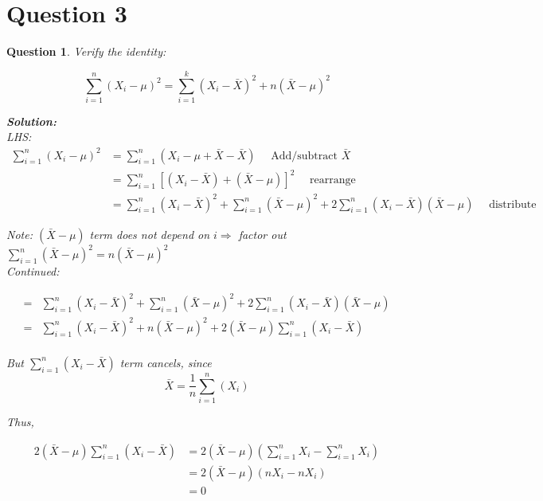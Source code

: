\documentclass{article}
\theoremstyle{questionstyle}
\newtheorem{myquestion}{Question}
\begin{document}

\section{Question 3}
\begin{myquestion}
    Verify the identity:
    
    \[ \sum_{i=1}^{n}(X_i - \mu)^2 = \sum_{i=1}^{k}(X_i - \bar{X})^2 + n(\bar{X} - \mu)^2 \]

\textbf{Solution:}\\
LHS: 
\begin{align*}
    \sum_{i=1}^{n} (X_i - \mu )^2 &= \sum_{i=1}^{n}( X_i - \mu + \bar{X} - \bar{X}) \quad \text{ Add/subtract } \bar{X}\\
    &= \sum_{i=1}^{n}\left[ (X_i- \bar{X} ) + (\bar{X}- \mu) \right]^2 \quad \text{ rearrange} \\
    &= \sum_{i=1}^{n} (X_i - \bar{X})^2 + \sum_{i=1}^{n}(\bar{X} - \mu)^2 + 2\sum_{i=1}^{n} (X_i - \bar{X})(\bar{X} - \mu) \quad \text{ distribute }
\end{align*}

Note: \((\bar{X} - \mu)\) term does not depend on \(i \Rightarrow\) factor out \( \sum_{i=1}^{n}(\bar{X} - \mu)^2 = n(\bar{X} - \mu)^2 \)\\

Continued: 

\begin{align*}
    =& \sum_{i=1}^{n} (X_i - \bar{X})^2 + \sum_{i=1}^{n}(\bar{X} - \mu)^2 + 2\sum_{i=1}^{n} (X_i - \bar{X})(\bar{X} - \mu)\\
    =& \sum_{i=1}^{n} (X_i - \bar{X})^2 + n(\bar{X} - \mu)^2 + 2(\bar{X} - \mu) \sum_{i=1}^{n} (X_i - \bar{X})\\
\end{align*}

But \( \sum_{i=1}^{n}(X_i - \bar{X}) \) term cancels, since \[\bar{X} = \frac{1}{n}\sum_{i=1}^{n}(X_i) \]

Thus, 

\begin{align*}
    2(\bar{X} - \mu)\sum_{i=1}^{n}(X_i - \bar{X}) &= 2(\bar{X} - \mu) \left( \sum_{i=1}^{n}X_i - \sum_{i=1}^{n}X_i  \right)\\
    &=  2(\bar{X} - \mu)\left( nX_i - nX_i  \right)\\
    &= 0
\end{align*}


\end{myquestion}
\end{document}

